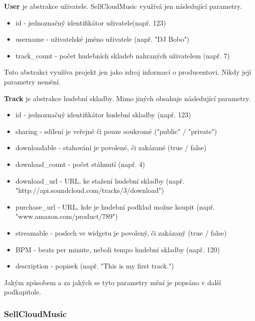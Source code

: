 \documentclass[12pt]{article}
\begin{document}
\begin{description}
\item{\textbf{User}} je abstrakce uživatele. SellCloudMusic využívá jen následující parametry.

\begin{itemize}
\item{id} - jednoznačný identifikátor uživatele(např. 123)
\item{username} - uživatelské jméno uživatele (např. "DJ Bobo")
\item{track\_count} - počet hudebních skladeb nahraných uživatelem (např. 7)
\end{itemize}

Tuto abstrakci využíva projekt jen jako zdroj informací o producentovi. Nikdy její parametry nemění.

\item{\textbf{Track}} je abstrakce hudební skladby. Mimo jiných obsahuje následující parametry.

\begin{itemize}
\item{id} - jednoznačný identifikátor hudební skladby (např. 123)
\item{sharing} -  sdílení je veřejné či pouze soukromé ("public" / "private")
\item{downloadable} - stahování je povolené, či zakázané (true / false)
\item{download\_count} - počet stáhnutí (např. 4)
\item{download\_url} - URL, ke stažení hudební skladby (např. "http://api.soundcloud.com/tracks/3/download")
\item{purchase\_url} - URL, kde je hudební podklad možne koupit (např. "www.amazon.com/product/789")
\item{streamable} - poslech ve widgetu je povolený, či zakázaný (true / false) 
\item{BPM} - beats per minute, neboli tempo hudební skladby (např. 120)
\item{description} - popisek (např. "This is my first track.")
\end{itemize}

\end{description}

Jakým způsobem a za jakých se tyto parametry mění je popsáno v další podkapitole.

\subsubsection{SellCloudMusic}
\end{document}
